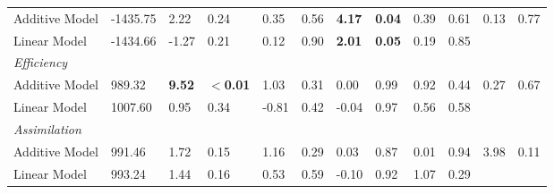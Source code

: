 \begin{landscape}
\begin{table}
\begin{tabular}{@{}llllllllllll@{}}
Additive Model & -1435.75 & 2.22 & 0.24 & 0.35 & 0.56 & \textbf{4.17} & \textbf{0.04} & 0.39 & 0.61 & 0.13 & 0.77 \\
Linear Model & -1434.66 & -1.27 & 0.21 & 0.12 & 0.90 & \textbf{2.01} & \textbf{0.05} & 0.19 & 0.85 &  &  \\
\textit{Efficiency} &  &  &  &  &  &  &  &  &  &  &  \\
Additive Model & 989.32 & \textbf{9.52} & \textbf{$<$0.01} & 1.03 & 0.31 & 0.00 & 0.99 & 0.92 & 0.44 & 0.27 & 0.67 \\
Linear Model & 1007.60 & 0.95 & 0.34 & -0.81 & 0.42 & -0.04 & 0.97 & 0.56 & 0.58 &  &  \\
\textit{Assimilation} &  &  &  &  &  &  &  &  &  &  &  \\
Additive Model & 991.46 & 1.72 & 0.15 & 1.16 & 0.29 & 0.03 & 0.87 & 0.01 & 0.94 & 3.98 & 0.11 \\
Linear Model & 993.24 & 1.44 & 0.16 & 0.53 & 0.59 & -0.10 & 0.92 & 1.07 & 0.29 &  &  \\ \bottomrule
\end{tabular}
\end{table}


\end{landscape}
%
%

